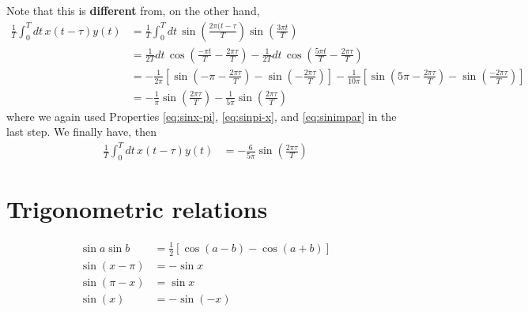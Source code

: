 \documentclass{article}
\begin{document}
Note that this is {\bf different} from, on the other hand, 
\begin{align}
  \frac{1}{T} \int_0^T dt\, x(t-\tau) y(t) &=
  \frac{1}{T} \int_0^T dt\, \sin\left( \frac{2\pi (t-\tau}{T}\right) \sin\left( \frac{3\pi t}{T}\right) \\
  &= \frac{1}{2T} dt\, \cos \left( \frac{-\pi t}{T} - \frac{2\pi \tau}{T}\right)
  -  \frac{1}{2T} dt\, \cos \left( \frac{5\pi t}{T} - \frac{2\pi \tau}{T}\right) \\
  &= 
  -\frac{1}{2\pi} \left[
    \sin\left(-\pi - \frac{2\pi\tau}{T} \right)
    - \sin\left(-\frac{2\pi\tau}{T} \right)
  \right]
  -\frac{1}{10\pi} \left[
    \sin\left(5\pi - \frac{2\pi\tau}{T} \right)
    - \sin\left(\frac{-2\pi\tau}{T} \right)
  \right] \\
  &= -\frac{1}{\pi} 
    \sin\left(\frac{2\pi\tau}{T} \right)
  -\frac{1}{5\pi}
    \sin\left(\frac{2\pi\tau}{T} \right)
\end{align}
where we again used Properties \ref{eq:sinx-pi}, \ref{eq:sinpi-x}, and \ref{eq:sinimpar} in the last step. We finally have, then
\begin{align}
  \frac{1}{T} \int_0^T dt\, x(t-\tau) y(t) &=
 -\frac{6}{5\pi} 
    \sin\left(\frac{2\pi\tau}{T} \right)
\end{align}

% 


\appendix

\section*{Trigonometric relations}

\begin{align}
  \sin a \sin b &= \frac{1}{2}\left[ 
  \cos(a-b) - \cos(a+b)
\right]\label{eq:sinasinb} \\
\sin(x-\pi) &= -\sin x \label{eq:sinx-pi} \\
\sin(\pi-x) &= \sin x \label{eq:sinpi-x} \\
\sin(x) &= - \sin(-x) \label{eq:sinimpar}
\end{align}
\end{document}
